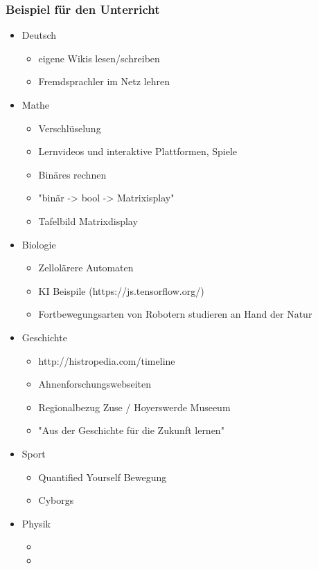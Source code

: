 \documentclass[12pt]{beamer}
\begin{document}
\begin{frame}
	\frametitle{Beispiel für den Unterricht}
	\begin{itemize}
		\item<1-> Deutsch
			\begin{itemize}
				\item<1-> eigene Wikis lesen/schreiben
				\item<2-> Fremdsprachler im Netz lehren
			\end{itemize}
		\item<2-> Mathe
			\begin{itemize}
				\item<2-> Verschlüselung
				\item<1-> Lernvideos und interaktive Plattformen, Spiele
				\item<2-> Binäres rechnen
				\item<2-> "binär -> bool -> Matrixisplay"
				\item<2-> Tafelbild Matrixdisplay
			\end{itemize}
		\item<2-> Biologie
			\begin{itemize}
				\item<1-> Zellolärere Automaten
				\item<2-> KI Beispile (https://js.tensorflow.org/)
				\item<2-> Fortbewegungsarten von Robotern studieren an Hand der Natur
			\end{itemize}
		\item<2-> Geschichte
			\begin{itemize}
				\item<1-> http://histropedia.com/timeline
				\item<2-> Ahnenforschungswebseiten
				\item<2-> Regionalbezug Zuse / Hoyerswerde Museeum
				\item<2-> "Aus der Geschichte für die Zukunft lernen"
			\end{itemize}
		\item<2-> Sport
			\begin{itemize}
				\item<1-> Quantified Yourself Bewegung
				\item<2-> Cyborgs
			\end{itemize}
		\item<2-> Physik
			\begin{itemize}
				\item<1-> 
				\item<2-> 
			\end{itemize}
	\end{itemize}
\end{frame}
\end{document}
